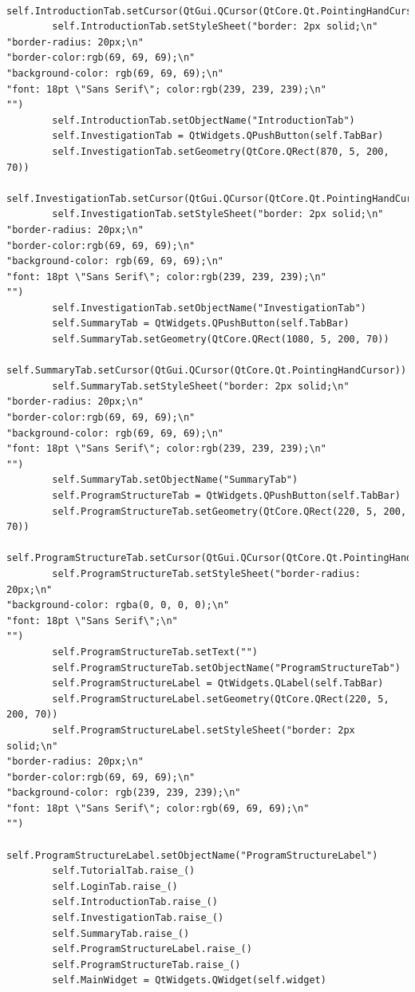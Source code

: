 \documentclass[12pt]{article}
\begin{document}
\begin{lstlisting}
        self.IntroductionTab.setCursor(QtGui.QCursor(QtCore.Qt.PointingHandCursor))
        self.IntroductionTab.setStyleSheet("border: 2px solid;\n"
"border-radius: 20px;\n"
"border-color:rgb(69, 69, 69);\n"
"background-color: rgb(69, 69, 69);\n"
"font: 18pt \"Sans Serif\"; color:rgb(239, 239, 239);\n"
"")
        self.IntroductionTab.setObjectName("IntroductionTab")
        self.InvestigationTab = QtWidgets.QPushButton(self.TabBar)
        self.InvestigationTab.setGeometry(QtCore.QRect(870, 5, 200, 70))
        self.InvestigationTab.setCursor(QtGui.QCursor(QtCore.Qt.PointingHandCursor))
        self.InvestigationTab.setStyleSheet("border: 2px solid;\n"
"border-radius: 20px;\n"
"border-color:rgb(69, 69, 69);\n"
"background-color: rgb(69, 69, 69);\n"
"font: 18pt \"Sans Serif\"; color:rgb(239, 239, 239);\n"
"")
        self.InvestigationTab.setObjectName("InvestigationTab")
        self.SummaryTab = QtWidgets.QPushButton(self.TabBar)
        self.SummaryTab.setGeometry(QtCore.QRect(1080, 5, 200, 70))
        self.SummaryTab.setCursor(QtGui.QCursor(QtCore.Qt.PointingHandCursor))
        self.SummaryTab.setStyleSheet("border: 2px solid;\n"
"border-radius: 20px;\n"
"border-color:rgb(69, 69, 69);\n"
"background-color: rgb(69, 69, 69);\n"
"font: 18pt \"Sans Serif\"; color:rgb(239, 239, 239);\n"
"")
        self.SummaryTab.setObjectName("SummaryTab")
        self.ProgramStructureTab = QtWidgets.QPushButton(self.TabBar)
        self.ProgramStructureTab.setGeometry(QtCore.QRect(220, 5, 200, 70))
        self.ProgramStructureTab.setCursor(QtGui.QCursor(QtCore.Qt.PointingHandCursor))
        self.ProgramStructureTab.setStyleSheet("border-radius: 20px;\n"
"background-color: rgba(0, 0, 0, 0);\n"
"font: 18pt \"Sans Serif\";\n"
"")
        self.ProgramStructureTab.setText("")
        self.ProgramStructureTab.setObjectName("ProgramStructureTab")
        self.ProgramStructureLabel = QtWidgets.QLabel(self.TabBar)
        self.ProgramStructureLabel.setGeometry(QtCore.QRect(220, 5, 200, 70))
        self.ProgramStructureLabel.setStyleSheet("border: 2px solid;\n"
"border-radius: 20px;\n"
"border-color:rgb(69, 69, 69);\n"
"background-color: rgb(239, 239, 239);\n"
"font: 18pt \"Sans Serif\"; color:rgb(69, 69, 69);\n"
"")
        self.ProgramStructureLabel.setObjectName("ProgramStructureLabel")
        self.TutorialTab.raise_()
        self.LoginTab.raise_()
        self.IntroductionTab.raise_()
        self.InvestigationTab.raise_()
        self.SummaryTab.raise_()
        self.ProgramStructureLabel.raise_()
        self.ProgramStructureTab.raise_()
        self.MainWidget = QtWidgets.QWidget(self.widget)

\end{lstlisting}
\end{document}

